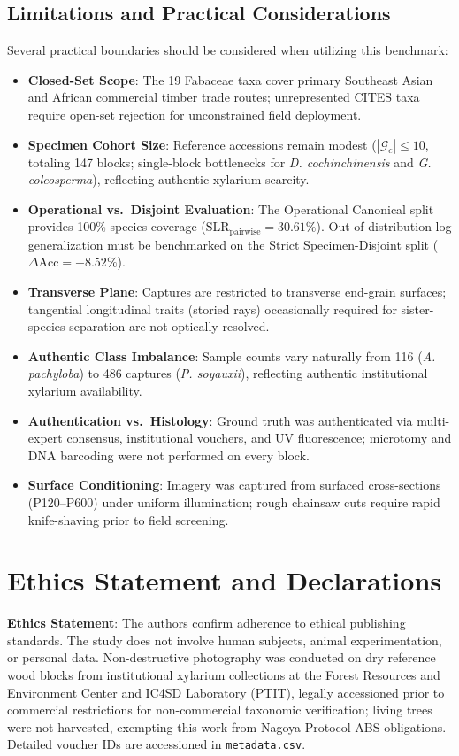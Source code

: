 \documentclass[a4paper,fleqn,12pt]{cas-sc}
\begin{document}
\subsection{Limitations and Practical Considerations}
\label{sec:limitations}

Several practical boundaries should be considered when utilizing this benchmark:
\begin{itemize}[leftmargin=*,itemsep=0pt,topsep=0pt,parsep=0pt,partopsep=0pt]
    \item \textbf{Closed-Set Scope}: The 19 Fabaceae taxa cover primary Southeast Asian and African commercial timber trade routes; unrepresented CITES taxa require open-set rejection for unconstrained field deployment.
    \item \textbf{Specimen Cohort Size}: Reference accessions remain modest ($|\mathcal{G}_c| \le 10$, totaling 147 blocks; single-block bottlenecks for \textit{D. cochinchinensis} and \textit{G. coleosperma}), reflecting authentic xylarium scarcity.
    \item \textbf{Operational vs.\ Disjoint Evaluation}: The Operational Canonical split provides 100\% species coverage ($\text{SLR}_{\text{pairwise}} = 30.61\%$). Out-of-distribution log generalization must be benchmarked on the Strict Specimen-Disjoint split ($\Delta\text{Acc} = -8.52\%$).
    \item \textbf{Transverse Plane}: Captures are restricted to transverse end-grain surfaces; tangential longitudinal traits (storied rays) occasionally required for sister-species separation are not optically resolved.
    \item \textbf{Authentic Class Imbalance}: Sample counts vary naturally from 116 (\textit{A. pachyloba}) to 486 captures (\textit{P. soyauxii}), reflecting authentic institutional xylarium availability.
    \item \textbf{Authentication vs.\ Histology}: Ground truth was authenticated via multi-expert consensus, institutional vouchers, and UV fluorescence; microtomy and DNA barcoding were not performed on every block.
    \item \textbf{Surface Conditioning}: Imagery was captured from surfaced cross-sections (P120--P600) under uniform illumination; rough chainsaw cuts require rapid knife-shaving prior to field screening.
\end{itemize}

\section{Ethics Statement and Declarations}
\label{sec:ethics}
\noindent
\textbf{Ethics Statement}: The authors confirm adherence to ethical publishing standards. The study does not involve human subjects, animal experimentation, or personal data. Non-destructive photography was conducted on dry reference wood blocks from institutional xylarium collections at the Forest Resources and Environment Center and IC4SD Laboratory (PTIT), legally accessioned prior to commercial restrictions for non-commercial taxonomic verification; living trees were not harvested, exempting this work from Nagoya Protocol ABS obligations. Detailed voucher IDs are accessioned in \texttt{metadata.csv}.
\end{document}
